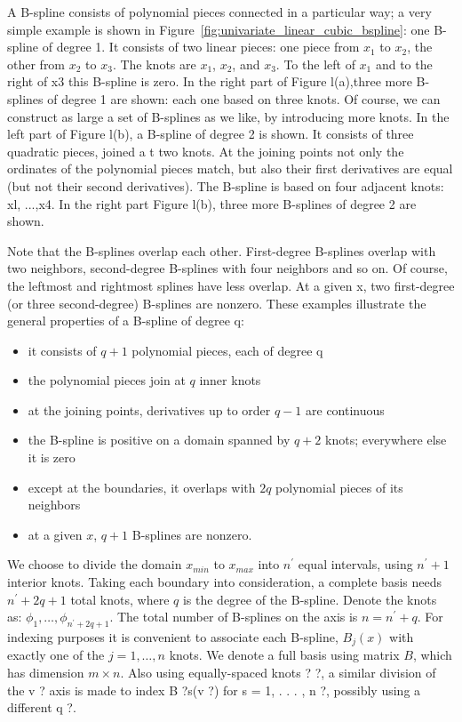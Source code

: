 \documentclass[12pt]{article}
\newcommand*\needsparaphrased{\color{red}}
\begin{document}
{\needsparaphrased A B-spline consists of polynomial pieces connected in a particular way; a very simple example is shown in Figure~\ref{fig:univariate_linear_cubic_bspline}: one B-spline of degree 1. It consists of two linear pieces: one piece from $x_1$ to $x_2$, the other from $x_2$ to $x_3$. The knots are $x_1$, $x_2$, and $x_3$. To the left of $x_1$ and to the right of x3 this B-spline is zero. In the right part of Figure l(a),three more B-splines of degree 1 are shown: each one based on three knots. Of course, we can construct as large a set of B-splines as we like, by introducing more knots.
In the left part of Figure l(b), a B-spline of degree 2 is shown. It consists of three quadratic pieces, joined a t two knots. At the joining points not only the ordinates of the polynomial pieces match, but also their first derivatives are equal (but not their second derivatives). The B-spline is based on four adjacent knots: xl, ...,x4. In the right part Figure l(b), three more B-splines of degree 2 are shown.

Note that the B-splines overlap each other. First-degree B-splines overlap with two neighbors, second-degree B-splines with four neighbors and so on. Of course, the leftmost and rightmost splines have less overlap. At a given x, two first-degree (or three second-degree) B-splines are nonzero. These examples illustrate the general properties of a B-spline of degree q:
\begin{itemize}
\item it consists of $q + 1$ polynomial pieces, each of degree q\\
\item the polynomial pieces join at $q$ inner knots\\
\item at the joining points, derivatives up to order $q - 1$ are continuous\\
\item the B-spline is positive on a domain spanned by $q +2$ knots; everywhere else it is zero\\
\item except at the boundaries, it overlaps with $2q$ polynomial pieces of its neighbors\\
\item at a given $x$, $q +1$ B-splines are nonzero.
\end{itemize}

We choose to divide the domain $x_{min}$ to $x_{max}$ into $n^\prime$ equal intervals, using $n^\prime +1$ interior knots. Taking each boundary into consideration, a complete basis needs $n^\prime + 2q + 1$ total knots, where $q$ is the degree of the B-spline. Denote the knots as: $\phi_1,\dots ,\phi_{n^\prime+2q+1}$. The total number of B-splines on the axis is $n = n^\prime + q$. For indexing purposes it is convenient to associate each B-spline, $B_j\left(x\right)$ with exactly one of the $j = 1, \dots , n$ knots. We denote a full basis using matrix $B$, which has dimension $m \times n$. Also using equally-spaced knots ? ?, a similar division of the v ? axis is made to index B ?s(v ?) for s = 1, . . . , n ?, possibly using a different q ?.

}
\end{document}
